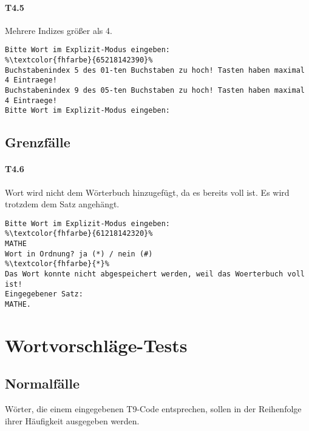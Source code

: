 \paragraph*{T4.5} Mehrere Indizes größer als 4.
\begin{lstlisting}[escapechar=\%]
Bitte Wort im Explizit-Modus eingeben:
%\textcolor{fhfarbe}{65218142390}%
Buchstabenindex 5 des 01-ten Buchstaben zu hoch! Tasten haben maximal 4 Eintraege!
Buchstabenindex 9 des 05-ten Buchstaben zu hoch! Tasten haben maximal 4 Eintraege!
Bitte Wort im Explizit-Modus eingeben:
\end{lstlisting}

\subsection*{Grenzfälle}\label{subsec:semantik-grenz}
\paragraph*{T4.6} Wort wird nicht dem Wörterbuch hinzugefügt, da es bereits voll ist. Es wird trotzdem dem Satz angehängt.
\begin{lstlisting}[escapechar=\%]
Bitte Wort im Explizit-Modus eingeben:
%\textcolor{fhfarbe}{61218142320}%
MATHE
Wort in Ordnung? ja (*) / nein (#)
%\textcolor{fhfarbe}{*}%
Das Wort konnte nicht abgespeichert werden, weil das Woerterbuch voll ist!
Eingegebener Satz:
MATHE.
\end{lstlisting}


\section{Wortvorschläge-Tests}\label{sec:wortvorschläge-tests}
\subsection*{Normalfälle}\label{subsec:vorschlag-normalfaelle}
Wörter, die einem eingegebenen T9-Code entsprechen, sollen in der Reihenfolge ihrer Häufigkeit ausgegeben werden.
